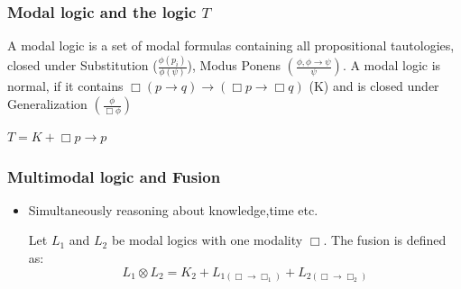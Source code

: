 \documentclass[hyperref={pdfpagelabels=false},t,10pt]{beamer}
\begin{document}
\begin{frame}
  \frametitle{Modal logic and the logic $T$}
  \begin{definition}
    A modal logic is a set of modal formulas containing all propositional tautologies, closed under Substitution ($\frac{\phi(p_i)}{\phi(\psi)}$), Modus Ponens $(\frac{\phi, \phi \rightarrow \psi}{\psi})$. \newline \newline \pause
    A modal logic is normal, if it contains $\Box (p \rightarrow q) \rightarrow (\Box p \rightarrow \Box q)$ (K) and is closed under Generalization $(\frac{\phi}{\Box \phi})$
  \end{definition}

  \begin{definition}
      $T = K + \Box p \rightarrow p$
  \end{definition}
\end{frame}



\begin{frame}
  \frametitle{Multimodal logic and Fusion}
  \begin{itemize}
    \item Simultaneously reasoning about knowledge,time etc. 
       \begin{definition}
      Let $L_1$ and $L_2$ be modal logics with one modality $\Box$. The fusion is defined as:
      $$ L_1 \otimes L_2 = K_2 + L_{1(\Box \rightarrow \Box_1)} + L_{2(\Box \rightarrow \Box_2)} $$    
    \end{definition}

  \end{itemize}
\end{frame}
\end{document}
